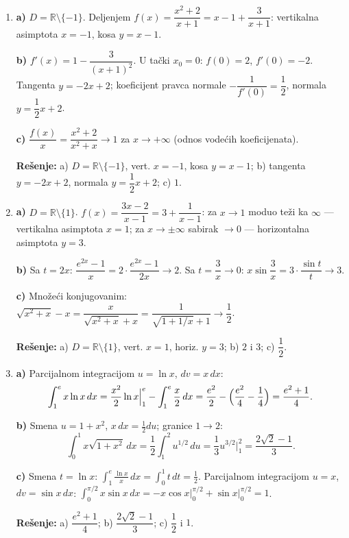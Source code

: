 \begin{enumerate}[label=\arabic*.]
  \textbf{b)} Smena $u=x^2-4$, $x\,dx=\tfrac12 du$; granice $x=2\Rightarrow u=0$, $x=3\Rightarrow u=5$:
  \[
  \int_{2}^{3} x(x^2-4)^2dx=\frac12\int_{0}^{5} u^2\,du=\frac12\cdot\frac{u^3}{3}\Big|_{0}^{5}=\frac{125}{6}.
  \]

  \textbf{c)} $h(x)=x(x-2)(x+2)$ ima nule $-2,0,2$; na $(-2,0)$ $h>0$, na $(0,2)$ $h<0$. Računamo po modulu:
  \[
  \int_{-2}^{0}(x^3-4x)dx=4,\qquad \int_{0}^{2}(x^3-4x)dx=-4,\qquad S=|4|+|-4|=8.
  \]

  \textbf{Rešenje:} a) $g'=0$ za $x=-2,0,2$, ekstremna vrednost samo u $x=0$ (min $-64$); b) $\dfrac{125}{6}$; c) $S=8$.

  \item \textbf{a)} $D=\mathbb{R}\setminus\{-1\}$. Deljenjem $f(x)=\dfrac{x^2+2}{x+1}=x-1+\dfrac{3}{x+1}$: vertikalna asimptota $x=-1$, kosa $y=x-1$.

  \textbf{b)} $f'(x)=1-\dfrac{3}{(x+1)^2}$. U tački $x_0=0$: $f(0)=2$, $f'(0)=-2$. Tangenta $y=-2x+2$; koeficijent pravca normale $-\dfrac{1}{f'(0)}=\dfrac12$, normala $y=\dfrac12 x+2$.

  \textbf{c)} $\dfrac{f(x)}{x}=\dfrac{x^2+2}{x^2+x}\to 1$ za $x\to+\infty$ (odnos vodećih koeficijenata).

  \textbf{Rešenje:} a) $D=\mathbb{R}\setminus\{-1\}$, vert. $x=-1$, kosa $y=x-1$; b) tangenta $y=-2x+2$, normala $y=\dfrac12 x+2$; c) $1$.

  \item \textbf{a)} $D=\mathbb{R}\setminus\{1\}$. $f(x)=\dfrac{3x-2}{x-1}=3+\dfrac{1}{x-1}$: za $x\to 1$ moduo teži ka $\infty$ — vertikalna asimptota $x=1$; za $x\to\pm\infty$ sabirak $\to 0$ — horizontalna asimptota $y=3$.

  \textbf{b)} Sa $t=2x$: $\dfrac{e^{2x}-1}{x}=2\cdot\dfrac{e^{2x}-1}{2x}\to 2$. Sa $t=\dfrac{3}{x}\to 0$: $x\sin\dfrac{3}{x}=3\cdot\dfrac{\sin t}{t}\to 3$.

  \textbf{c)} Množeći konjugovanim: $\sqrt{x^2+x}-x=\dfrac{x}{\sqrt{x^2+x}+x}=\dfrac{1}{\sqrt{1+1/x}+1}\to\dfrac12$.

  \textbf{Rešenje:} a) $D=\mathbb{R}\setminus\{1\}$, vert. $x=1$, horiz. $y=3$; b) $2$ i $3$; c) $\dfrac12$.

  \item \textbf{a)} Parcijalnom integracijom $u=\ln x$, $dv=x\,dx$:
  \[
  \int_{1}^{e} x\ln x\,dx=\frac{x^2}{2}\ln x\Big|_{1}^{e}-\int_{1}^{e}\frac{x}{2}\,dx=\frac{e^2}{2}-\Bigl(\frac{e^2}{4}-\frac14\Bigr)=\frac{e^2+1}{4}.
  \]

  \textbf{b)} Smena $u=1+x^2$, $x\,dx=\tfrac12 du$; granice $1\to 2$:
  \[
  \int_{0}^{1} x\sqrt{1+x^2}\,dx=\frac12\int_{1}^{2} u^{1/2}\,du=\frac13 u^{3/2}\Big|_{1}^{2}=\frac{2\sqrt2-1}{3}.
  \]

  \textbf{c)} Smena $t=\ln x$: $\displaystyle\int_{1}^{e}\frac{\ln x}{x}\,dx=\int_{0}^{1} t\,dt=\frac12$. Parcijalnom integracijom $u=x$, $dv=\sin x\,dx$: $\displaystyle\int_{0}^{\pi/2} x\sin x\,dx=-x\cos x\Big|_{0}^{\pi/2}+\sin x\Big|_{0}^{\pi/2}=1$.

  \textbf{Rešenje:} a) $\dfrac{e^2+1}{4}$; b) $\dfrac{2\sqrt2-1}{3}$; c) $\dfrac12$ i $1$.
\end{enumerate}
\clearpage
